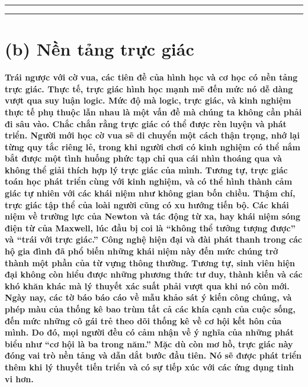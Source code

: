 \noindent\rule{\textwidth}{.4pt}

\noindent\rule{\textwidth}{.4pt}

\section*{(b) Nền tảng trực giác}

{\bf Trái ngược với cờ vua, các tiên đề của hình học và cơ học có nền tảng trực giác. Thực tế, trực giác hình học mạnh mẽ đến mức nó dễ dàng vượt qua suy luận logic. Mức độ mà logic, trực giác, và kinh nghiệm thực tế phụ thuộc lẫn nhau là một vấn đề mà chúng ta không cần phải đi sâu vào. Chắc chắn rằng trực giác có thể được rèn luyện và phát triển. Người mới học cờ vua sẽ di chuyển một cách thận trọng, nhớ lại từng quy tắc riêng lẻ, trong khi người chơi có kinh nghiệm có thể nắm bắt được một tình huống phức tạp chỉ qua cái nhìn thoáng qua và không thể giải thích hợp lý trực giác của mình. Tương tự, trực giác toán học phát triển cùng với kinh nghiệm, và có thể hình thành cảm giác tự nhiên với các khái niệm như không gian bốn chiều. Thậm chí, trực giác tập thể của loài người cũng có xu hướng tiến bộ. Các khái niệm về trường lực của Newton và tác động từ xa, hay khái niệm sóng điện từ của Maxwell, lúc đầu bị coi là ``không thể tưởng tượng được'' và ``trái với trực giác.'' Công nghệ hiện đại và đài phát thanh trong các hộ gia đình đã phổ biến những khái niệm này đến mức chúng trở thành một phần của từ vựng thông thường. Tương tự, sinh viên hiện đại không còn hiểu được những phương thức tư duy, thành kiến và các khó khăn khác mà lý thuyết xác suất phải vượt qua khi nó còn mới. Ngày nay, các tờ báo báo cáo về mẫu khảo sát ý kiến công chúng, và phép màu của thống kê bao trùm tất cả các khía cạnh của cuộc sống, đến mức những cô gái trẻ theo dõi thống kê về cơ hội kết hôn của mình. Do đó, mọi người đều có cảm nhận về ý nghĩa của những phát biểu như ``cơ hội là ba trong năm.'' Mặc dù còn mơ hồ, trực giác này đóng vai trò nền tảng và dẫn dắt bước đầu tiên. Nó sẽ được phát triển thêm khi lý thuyết tiến triển và có sự tiếp xúc với các ứng dụng tinh vi hơn.}


